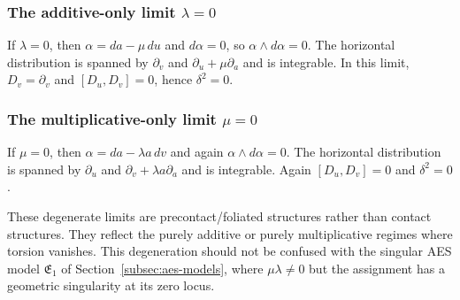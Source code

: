 \subsubsection*{The additive-only limit \texorpdfstring{$\lambda=0$}{lambda=0}}
If $\lambda=0$, then $\alpha=da-\mu\,du$ and $d\alpha=0$, so $\alpha\wedge d\alpha=0$. The horizontal distribution is spanned by $\partial_v$ and $\partial_u+\mu\partial_a$ and is integrable. In this limit, $D_v=\partial_v$ and $[D_u,D_v]=0$, hence $\delta^2=0$.

\subsubsection*{The multiplicative-only limit \texorpdfstring{$\mu=0$}{mu=0}}
If $\mu=0$, then $\alpha=da-\lambda a\,dv$ and again $\alpha\wedge d\alpha=0$. The horizontal distribution is spanned by $\partial_u$ and $\partial_v+\lambda a\partial_a$ and is integrable. Again $[D_u,D_v]=0$ and $\delta^2=0$.

These degenerate limits are precontact/foliated structures rather than contact structures. They reflect the purely additive or purely multiplicative regimes where torsion vanishes. This degeneration should not be confused with the singular AES model $\mathfrak{E}_1$ of Section~\ref{subsec:aes-models}, where $\mu\lambda\neq 0$ but the assignment has a geometric singularity at its zero locus.
